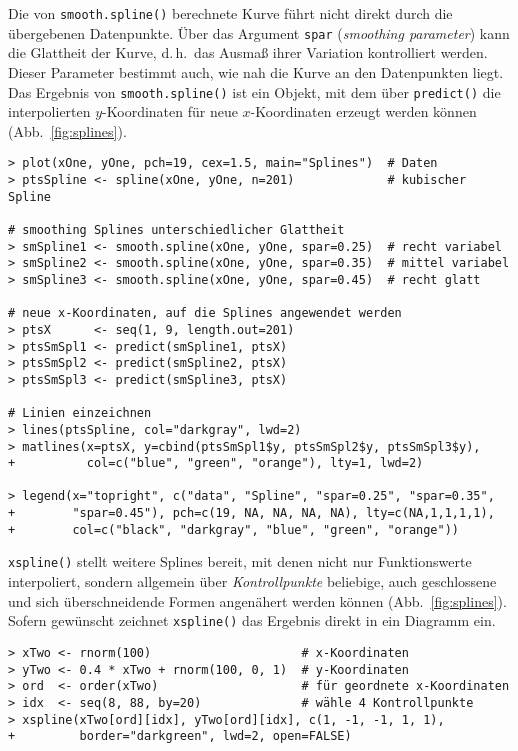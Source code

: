 Die von  \lstinline!smooth.spline()! berechnete Kurve führt nicht direkt durch die übergebenen Datenpunkte. Über das Argument \lstinline!spar! (\emph{smoothing parameter}) kann die Glattheit der Kurve, d.\,h.\ das Ausmaß ihrer Variation kontrolliert werden. Dieser Parameter bestimmt auch, wie nah die Kurve an den Datenpunkten liegt. Das Ergebnis von \lstinline!smooth.spline()! ist ein Objekt, mit dem über \lstinline!predict()! die interpolierten $y$-Koordinaten für neue $x$-Koordinaten erzeugt werden können (Abb.\ \ref{fig:splines}).
\begin{lstlisting}
> plot(xOne, yOne, pch=19, cex=1.5, main="Splines")  # Daten
> ptsSpline <- spline(xOne, yOne, n=201)             # kubischer Spline

# smoothing Splines unterschiedlicher Glattheit
> smSpline1 <- smooth.spline(xOne, yOne, spar=0.25)  # recht variabel
> smSpline2 <- smooth.spline(xOne, yOne, spar=0.35)  # mittel variabel
> smSpline3 <- smooth.spline(xOne, yOne, spar=0.45)  # recht glatt

# neue x-Koordinaten, auf die Splines angewendet werden
> ptsX      <- seq(1, 9, length.out=201)
> ptsSmSpl1 <- predict(smSpline1, ptsX)
> ptsSmSpl2 <- predict(smSpline2, ptsX)
> ptsSmSpl3 <- predict(smSpline3, ptsX)

# Linien einzeichnen
> lines(ptsSpline, col="darkgray", lwd=2)
> matlines(x=ptsX, y=cbind(ptsSmSpl1$y, ptsSmSpl2$y, ptsSmSpl3$y),
+          col=c("blue", "green", "orange"), lty=1, lwd=2)

> legend(x="topright", c("data", "Spline", "spar=0.25", "spar=0.35",
+        "spar=0.45"), pch=c(19, NA, NA, NA, NA), lty=c(NA,1,1,1,1),
+        col=c("black", "darkgray", "blue", "green", "orange"))
\end{lstlisting}

\lstinline!xspline()! stellt weitere Splines bereit, mit denen nicht nur Funktionswerte interpoliert, sondern allgemein über \emph{Kontrollpunkte} beliebige, auch geschlossene und sich überschneidende Formen angenähert werden können (Abb.\ \ref{fig:splines}). Sofern gewünscht zeichnet \lstinline!xspline()! das Ergebnis direkt in ein Diagramm ein.
\begin{lstlisting}
> xTwo <- rnorm(100)                     # x-Koordinaten
> yTwo <- 0.4 * xTwo + rnorm(100, 0, 1)  # y-Koordinaten
> ord  <- order(xTwo)                    # für geordnete x-Koordinaten
> idx  <- seq(8, 88, by=20)              # wähle 4 Kontrollpunkte
> xspline(xTwo[ord][idx], yTwo[ord][idx], c(1, -1, -1, 1, 1),
+         border="darkgreen", lwd=2, open=FALSE)
\end{lstlisting}


